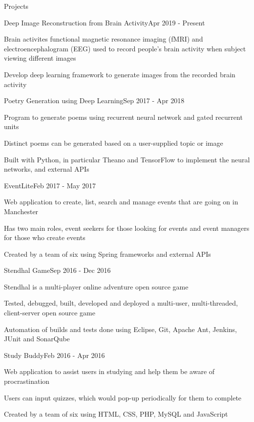 \documentclass{techresume} %
\begin{document}
\begin{rSection}{Projects}

\begin{rSubsection}{Deep Image Reconstruction from Brain Activity}{Apr 2019 - Present}{}{}
\item Brain activites functional magnetic resonance imaging (fMRI) and electroencephalogram (EEG) used to record people’s brain activity when subject viewing different images
\item Develop deep learning framework to generate images from the recorded brain activity
\end{rSubsection}

\begin{rSubsection}{Poetry Generation using Deep Learning}{Sep 2017 - Apr 2018}{}{}
\item Program to generate poems using recurrent neural network and gated recurrent units
\item Distinct poems can be generated based on a user-supplied topic or image
\item Built with Python, in particular Theano and TensorFlow to implement the neural networks, and external APIs
\end{rSubsection}

\begin{rSubsection}{EventLite}{Feb 2017 - May 2017}{}{}
\item Web application to create, list, search and manage events that are going on in Manchester
\item Has two main roles, event seekers for those looking for events and event managers for those who create events
\item Created by a team of six using Spring frameworks and external APIs
\end{rSubsection}

\begin{rSubsection}{Stendhal Game}{Sep 2016 - Dec 2016}{}{}
\item Stendhal is a multi-player online adventure open source game
\item Tested, debugged, built, developed and deployed a multi-user, multi-threaded, client-server open source game
\item Automation of builds and tests done using Eclipse, Git, Apache Ant, Jenkins, JUnit and SonarQube
\end{rSubsection}

\begin{rSubsection}{Study Buddy}{Feb 2016 - Apr 2016}{}{}
\item Web application to assist users in studying and help them be aware of procrastination
\item Users can input quizzes, which would pop-up periodically for them to complete
\item Created by a team of six using HTML, CSS, PHP, MySQL and JavaScript
\end{rSubsection}

\end{rSection}
\end{document}
